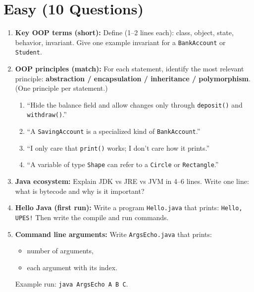 \documentclass[11pt,a4paper]{article}
\begin{document}
\section*{Easy (10 Questions)}
\begin{enumerate}[label=E\arabic*., leftmargin=*]
  \item \textbf{Key OOP terms (short):} Define (1--2 lines each): class, object, state, behavior, invariant.
    Give one example invariant for a \texttt{BankAccount} or \texttt{Student}.

  \item \textbf{OOP principles (match):} For each statement, identify the most relevant principle:
    \textbf{abstraction / encapsulation / inheritance / polymorphism}. (One principle per statement.)
    \begin{enumerate}[label=(\alph*), leftmargin=*]
      \item ``Hide the balance field and allow changes only through \texttt{deposit()} and \texttt{withdraw()}.''\\
      \item ``A \texttt{SavingAccount} is a specialized kind of \texttt{BankAccount}.''\\
      \item ``I only care that \texttt{print()} works; I don't care how it prints.''\\
      \item ``A variable of type \texttt{Shape} can refer to a \texttt{Circle} or \texttt{Rectangle}.''\\
    \end{enumerate}

  \item \textbf{Java ecosystem:} Explain JDK vs JRE vs JVM in 4--6 lines.
    Write one line: what is bytecode and why is it important?

  \item \textbf{Hello Java (first run):} Write a program \texttt{Hello.java} that prints:
    \texttt{Hello, UPES!}
    Then write the compile and run commands.

  \item \textbf{Command line arguments:} Write \texttt{ArgsEcho.java} that prints:
    \begin{itemize}[leftmargin=*]
      \item number of arguments,
      \item each argument with its index.
    \end{itemize}
    Example run: \texttt{java ArgsEcho A B C}.


\end{enumerate}
\end{document}
